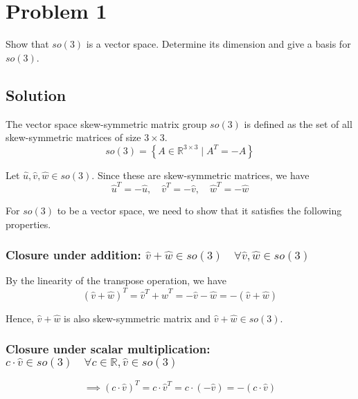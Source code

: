 \section*{Problem 1}

Show that \( so(3) \) is a vector space.
Determine its dimension and give a basis for \( so(3) \).

\subsection*{Solution}

The vector space skew-symmetric matrix group \( so(3) \) is defined as the set of all skew-symmetric matrices of size \( 3 \times 3 \).
\begin{equation*}
    so(3) = \left \{ A \in \mathbb{R}^{3 \times 3} \mid A^{T}=-A \right \}
\end{equation*}

Let \( \hat u, \hat v, \hat w \in so(3) \).
Since these are skew-symmetric matrices, we have
\[
    \hat u^{T} = -\hat u, \quad \hat v^{T} = -\hat v, \quad \hat w^{T} = -\hat w
\]

For \( so(3) \) to be a vector space, we need to show that it satisfies the following properties.

\subsubsection*{Closure under addition: \( \hat v + \hat w \in so(3) \quad \forall \hat v, \hat w \in so(3) \)}


By the linearity of the transpose operation, we have
\begin{equation*}
    {(\hat v + \hat w)}^{T} = \hat v^{T} + \hat w^{T} = -\hat v - \hat w = -(\hat v + \hat w)
\end{equation*}

Hence, \( \hat v + \hat w \) is also skew-symmetric matrix and \( \hat v + \hat w \in so(3) \).

\subsubsection*{Closure under scalar multiplication: \( c \cdot \hat v \in so(3) \quad \forall c \in \mathbb{R}, \hat v \in so(3) \)}

\begin{equation*}
    \implies
    {(c \cdot \hat v)}^{T} = c \cdot \hat v^{T} = c \cdot (-\hat v) = -(c \cdot \hat v)
\end{equation*}

